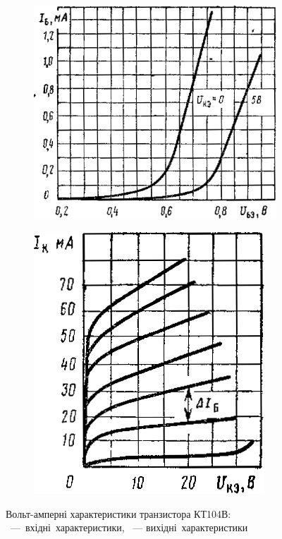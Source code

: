 \documentclass[14pt,ukrainian,utf8,simple]{eskdtext}
\begin{document}
		\begin{figure}[!htbp]
		\centering
			\begin{subfigure}[t]{0.5\textwidth - 0.5em}
			\centering
				\includegraphics[height = 9\baselineskip]{assets/03-kt104-vac-input.png}
			\caption{}
			\label{subfig:kt104-vac-input}
			\end{subfigure}%
			\quad
			\begin{subfigure}[t]{0.5\textwidth - 0.5em}
			\centering
				\includegraphics[height = 9\baselineskip]{assets/03-kt104-vac-output.png}
			\caption{}
			\label{subfig:kt104-vac-output}
			\end{subfigure}
		\caption{Вольт-амперні характеристики транзистора КТ104В: ~—~вхідні~характеристики, ~— вихідні~характеристики}
		\label{fig:kt104-vac}
		\end{figure}
	
\end{document}
